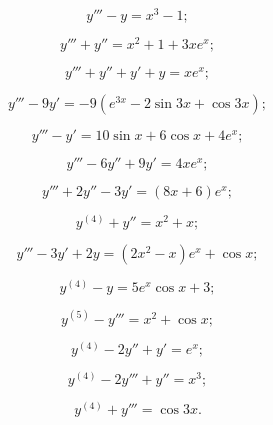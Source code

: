 \begin{multicols}{2}
    \begin{problem}
    	\[y'''-y=x^3-1;\]
    \end{problem}
 
    \begin{problem}
    	\[y'''+y''=x^2+1+3xe^x;\]
    \end{problem}
 
    \begin{problem}
    	\[y'''+y''+y'+y=xe^x;\]
    \end{problem}
 
    \begin{problem}
    	\[y'''-9y'=-9(e^{3x}-2\sin3x+\cos3x);\]
    \end{problem}
 
    \begin{problem}
    	\[y'''-y'=10\sin x+6\cos x+4e^x;\]
    \end{problem}
 
    \begin{problem}
    	\[y'''-6y''+9y'=4xe^x;\]
    \end{problem}
 
    \begin{problem}
    	\[y'''+2y''-3y'=(8x+6)e^x;\]
    \end{problem}
 
    \begin{problem}
    	\[y^{(4)}+y''=x^2+x;\]
    \end{problem}
 
    \begin{problem}
    	\[y'''-3y'+2y=(2x^2-x) e^x+\cos x;\]
    \end{problem}
 
    \begin{problem}
    	\[y^{(4)}-y=5e^x\cos x+3;\]
    \end{problem}
 
    \begin{problem}
    	\[y^{(5)}-y'''=x^2+\cos x;\]
    \end{problem}
 
    \begin{problem}
    	\[y^{(4)}-2y''+y'=e^x;\]
    \end{problem}
 
    \begin{problem}
    	\[y^{(4)}-2y'''+y''=x^3;\]
    \end{problem}
 
    \begin{problem}
    	\[y^{(4)}+y'''=\cos 3x.\]
    \end{problem}
\end{multicols}

